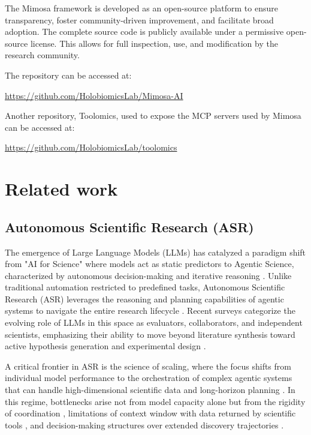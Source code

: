 \documentclass{article}
\begin{document}

The Mimosa framework is developed as an open-source platform to ensure transparency, foster community-driven improvement, and facilitate broad adoption. The complete source code is publicly available under a permissive open-source license. This allows for full inspection, use, and modification by the research community.

The repository can be accessed at:

\begin{center}
  \url{https://github.com/HolobiomicsLab/Mimosa-AI}
\end{center}

Another repository, Toolomics, used to expose the MCP servers used by Mimosa can be accessed at:

\begin{center}
  \url{https://github.com/HolobiomicsLab/toolomics}
\end{center}

\section{Related work}

\subsection{Autonomous Scientific Research (ASR)}


The emergence of Large Language Models (LLMs) has catalyzed a paradigm shift from "AI for Science" where models act as static predictors to Agentic Science, characterized by autonomous decision-making and iterative reasoning \cite{2_wei_ai_2025}. Unlike traditional automation restricted to predefined tasks, Autonomous Scientific Research (ASR) leverages the reasoning and planning capabilities of agentic systems to navigate the entire research lifecycle \cite{zhou2025autonomousagentsscientificdiscovery}. Recent surveys categorize the evolving role of LLMs in this space as evaluators, collaborators, and independent scientists, emphasizing their ability to move beyond literature synthesis toward active hypothesis generation and experimental design \cite{3_zhang_evolving_2025}.

A critical frontier in ASR is the science of scaling, where the focus shifts from individual model performance to the orchestration of complex agentic systems that can handle high-dimensional scientific data and long-horizon planning \cite{1_tang_ai-researcher_2025}. In this regime, bottlenecks arise not from model capacity alone but from the rigidity of coordination \cite{21_kim_towards_2025}, limitations of context window with data returned by scientific tools \cite{labate2025solvingcontextwindowoverflow}, and decision-making structures over extended discovery trajectories \cite{wang2026reasoningfailsplanplanningcentric}. 
\end{document}
